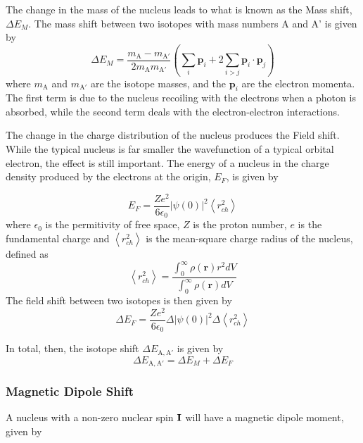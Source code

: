 \documentclass[12pt,a4paper,margin=1in]{report}
\begin{document}
The change in the mass of the nucleus leads to what is known as the Mass shift, $\Delta E_M$. The mass shift between two isotopes with mass numbers A and A' is given by
\begin{equation}
\Delta E_M = \frac{m_{\mathrm{A}}-m_{\mathrm{A'}}}{2 m_{\mathrm{A}} m_{\mathrm{A'}}} \left(\sum_i\mathrm{\textbf{p}}_i +2 \sum_{i>j}\mathrm{\textbf{p}}_i \cdot \mathrm{\textbf{p}}_j \right)
\end{equation}
where $m_{\mathrm{A}}$ and $m_{\mathrm{A'}}$ are the isotope masses, and the $\textbf{p}_i$ are the electron momenta. The first term is due to the nucleus recoiling with the electrons when a photon is absorbed, while the second term deals with the electron-electron interactions.  

The change in the charge distribution of the nucleus produces the Field shift. While the typical nucleus is far smaller the wavefunction of a typical orbital electron, the effect is still important. The energy of a nucleus in the charge density produced by the electrons at the origin, $E_F$, is given by

\begin{equation}
E_F = \frac{Ze^2}{6 \epsilon_0}|\psi(0)|^2 \left\langle r_{ch}^2\right\rangle
\end{equation}
where $\epsilon_0$ is the permitivity of free space, $Z$ is the proton number, $e$ is the fundamental charge and $ \left\langle r_{ch}^2\right\rangle$ is the mean-square charge radius of the nucleus, defined as
\begin{equation}
 \left\langle r_{ch}^2\right\rangle = \frac{\int_0^{\infty}\rho(\mathbf{r})r^2dV}{\int_0^{\infty}\rho(\mathbf{r})dV}
\end{equation}
The field shift between two isotopes is then given by
\begin{equation}
\Delta E_F =  \frac{Ze^2}{6 \epsilon_0}\Delta|\psi(0)|^2 \Delta\left\langle r_{ch}^2\right\rangle
\end{equation}

In total, then, the isotope shift $\Delta E_{\mathrm{A,A}'}$ is given by
\begin{equation}
 \Delta E_{\mathrm{A,A'}} = \Delta E_M + \Delta E_F
\end{equation}
\subsubsection*{Magnetic Dipole Shift}
A nucleus with a non-zero nuclear spin $\bf{I}$  will have a magnetic dipole moment, given by
\end{document}
